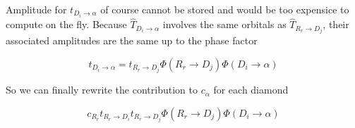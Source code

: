 \documentclass[./thesis.tex]{subfiles}
\begin{document}
Amplitude for $t_{D_i \rightarrow \alpha}$ of course cannot be stored and would be too expensice to compute on the fly. Because $\hat T_{D_i \rightarrow \alpha}$ involves the same orbitals as $\hat T_{R _r \rightarrow D_j}$, their associated amplitudes are the same up to the phase factor

\begin{equation}
t_{D_i \rightarrow \alpha} = t_{R _r \rightarrow D_j} \Phi(R _r \rightarrow D_j)\Phi(D_i \rightarrow \alpha)
\end{equation}

So we can finally rewrite the contribution to $c_\alpha$ for each diamond

\begin{equation}
c_{R _r} t_{R _r \rightarrow D_i} t_{R _r \rightarrow D_j} \Phi(R _r \rightarrow D_j)\Phi(D_i \rightarrow \alpha)
\end{equation}
\end{document}

